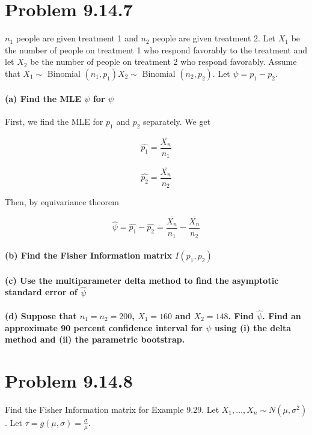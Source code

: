 \documentclass{article}\usepackage[]{graphicx}\usepackage[]{color}
\begin{document}
\section{Problem 9.14.7}
$n_1$ people are given treatment 1 and $n_2$ people are given treatment 2. Let $X_1$ be the number of people on treatment 1 who respond favorably to the treatment and let $X_2$ be the number of people on treatment 2 who respond favorably. Assume that $X_{1} \sim$ Binomial $(n_{1},p_{1}) X_{2} \sim$ Binomial $(n_{2}, p_{2})$. Let $\psi = p_{1}-p_{2}$. 

\paragraph*{(a) Find the MLE $\hat{\psi}$ for $\psi$}
First, we find the MLE for $p_{1}$ and $p_{2}$ separately. We get

$$\hat{p_{1}} = \frac{\overline{X_{n}}}{n_{1}}$$

$$\hat{p_{2}} = \frac{\overline{X_{n}}}{n_{2}}$$

Then, by equivariance theorem

$$\hat{\psi} = \hat{p_{1}} - \hat{p_{2}} = \frac{\overline{X_{n}}}{n_{1}} - \frac{\overline{X_{n}}}{n_{2}}$$



\paragraph*{(b) Find the Fisher Information matrix $I(p_{1},p_{2})$}

\paragraph*{(c) Use the multiparameter delta method to find the asymptotic standard error of $\hat{\psi}$}

\paragraph*{(d) Suppose that $n_{1} = n_{2} = 200$, $X_{1} = 160$ and $X_{2} = 148$. Find $\hat{\psi}$. Find an approximate 90 percent confidence interval for $\psi$ using (i) the delta method and (ii) the parametric bootstrap.}


\section{Problem 9.14.8}
Find the Fisher Information matrix for Example 9.29. Let $X_{1}, \ldots, X_{n} \sim N (\mu,\sigma^{2})$. Let $\tau = g(\mu,\sigma) = \frac{\sigma}{\mu}$.
\end{document}
